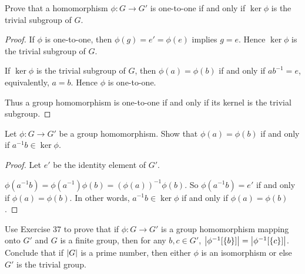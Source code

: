 \newpage
\begin{exercise}
    Prove that a homomorphism $\phi: G\to G'$ is one-to-one if and only if $\ker\phi$ is the trivial subgroup of $G$.
\end{exercise}

\begin{proof}
    If $\phi$ is one-to-one, then $\phi(g) = e' = \phi(e)$ implies $g = e$. Hence $\ker\phi$ is the trivial subgroup of $G$.

    If $\ker\phi$ is the trivial subgroup of $G$, then $\phi(a) = \phi(b)$ if and only if $ab^{-1} = e$, equivalently, $a = b$. Hence $\phi$ is one-to-one.

    Thus a group homomorphism is one-to-one if and only if its kernel is the trivial subgroup.
\end{proof}

\newpage
\begin{exercise}
    Let $\phi: G\to G'$ be a group homomorphism. Show that $\phi(a) = \phi(b)$ if and only if $a^{-1}b\in \ker\phi$.
\end{exercise}

\begin{proof}
    Let $e'$ be the identity element of $G'$.

    $\phi(a^{-1}b) = \phi(a^{-1})\phi(b) = {(\phi(a))}^{-1}\phi(b)$. So $\phi(a^{-1}b) = e'$ if and only if $\phi(a) = \phi(b)$. In other words, $a^{-1}b\in\ker\phi$ if and only if $\phi(a) = \phi(b)$.
\end{proof}

\newpage
\begin{exercise}
    Use Exercise 37 to prove that if $\phi: G\to G'$ is a group homomorphism mapping onto $G'$ and $G$ is a finite group, then for any $b, c\in G'$, $\left\vert{\phi^{-1}[\{b\}]}\right\vert = \left\vert{\phi^{-1}[\{c\}]}\right\vert$. Conclude that if $\left\vert{G}\right\vert$ is a prime number, then either $\phi$ is an isomorphism or else $G'$ is the trivial group.
\end{exercise}

